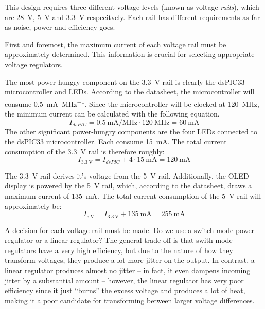 This  design  requires   three   different  voltage  levels  (known  as  voltage
\emph{rails}),  which  are  \SI{28}{\volt},  \SI{5}{\volt}  and  \SI{3.3}{\volt}
respecitvely. Each rail has  different  requirements  as far as noise, power and
efficiency goes.

First  and  foremost,  the  maximum  current  of  each   voltage  rail  must  be
approximately determined. This information is crucial for  selecting appropriate
voltage regulators.

The most  power-hungry  component  on  the  \SI{3.3}{\volt}  rail is clearly the
dsPIC33   microcontroller   and  LEDs.   According   to   the   datasheet,   the
microcontroller will  consume  \SI{0.5}{\milli\ampere\per\mega\hertz}. Since the
microcontroller will be clocked  at  \SI{120}{\mega\hertz},  the minimum current
can be calculated with the following equation.
\begin{equation}
    I_{dsPIC} = \SI{0.5}{\milli\ampere\per\mega\hertz} \cdot \SI{120}{\mega\hertz} = \SI{60}{\milli\ampere}
\end{equation}
The other significant power-hungry components are the four LEDs connected to the
dsPIC33 microcontroller. Each consume \SI{15}{\milli\ampere}. The total  current
consumption of the \SI{3.3}{\volt} rail is therefore roughly:
\begin{equation}
    I_{\SI{3.3}{\volt}} = I_{dsPIC} + 4 \cdot \SI{15}{\milli\ampere} = \SI{120}{\milli\ampere}
\end{equation}

The \SI{3.3}{\volt} rail  derives  it's  voltage  from  the  \SI{5}{\volt} rail.
Additionally,  the OLED display is powered by  the  \SI{5}{\volt}  rail,  which,
according to the datasheet, draws a maximum  current of \SI{135}{\milli\ampere}.
The total  current  consumption of the \SI{5}{\volt} rail will approximately be:
\begin{equation}
    I_{\SI{5}{\volt}} = I_{\SI{3.3}{\volt}} + \SI{135}{\milli\ampere} = \SI{255}{\milli\ampere}
\end{equation}

A  decision  for  each  voltage rail must be made. Do we use a switch-mode power
regulator  or a linear regulator?  The  general  trade-off  is  that  swith-mode
regulators have  a  very  high  efficiency,  but  due  to the nature of how they
transform voltages, they produce a lot more jitter on the output. In contrast, a
linear regulator produces almost  no jitter -- in fact, it even dampens incoming
jitter  by  a substantial amount -- however, the linear regulator has very  poor
efficiency since  it  just  ``burns''  the  excess voltage and produces a lot of
heat,  making  it  a  poor  candidate  for transforming between  larger  voltage
differences.

